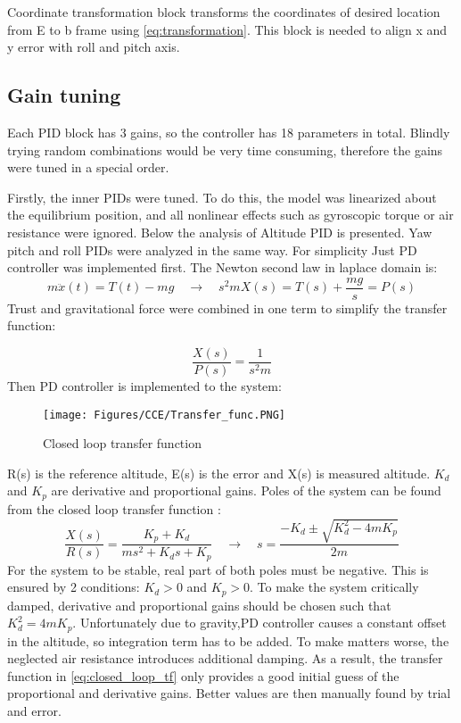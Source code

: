 Coordinate transformation block transforms the coordinates of desired location from E to b frame using \autoref{eq:transformation}. This block is needed to align x and y error with roll and pitch axis. 


\subsection{Gain tuning} \label{subsec:gain_tuning}
Each PID block has 3 gains, so the controller has 18 parameters in total. Blindly trying random combinations would be very time consuming, therefore the gains were tuned in a special order. 

Firstly, the inner PIDs were tuned. To do this, the model was linearized about the equilibrium position, and all nonlinear effects such as gyroscopic torque or air resistance were ignored. Below the analysis of Altitude PID is presented. Yaw pitch and roll PIDs were analyzed in the same way.
For simplicity Just PD controller was implemented first. The Newton second law in laplace domain is:
\begin{equation}
    m \ddot{x}(t) = T(t) - mg \quad \rightarrow \quad
    s^2 m X(s) = T(s) + \frac{mg}{s} = P(s)
\end{equation}
Trust and gravitational force were combined in one term to simplify the transfer function:

\begin{equation}
    \frac{X(s)}{P(s)} = \frac{1}{s^2m}
\end{equation}
Then PD controller is implemented to the system: 

\begin{figure}[H]
    \centering
    \texttt{[image: Figures/CCE/Transfer\_func.PNG]}
    \caption{Closed loop transfer function}
    \label{fig:controler}
\end{figure}

R(s) is the reference altitude, E(s) is the error and X(s) is measured altitude. $K_d$ and $K_p$ are derivative and proportional gains. Poles of the system can be found from the closed loop transfer function : 
\begin{equation}
\label{eq:closed_loop_tf}
    \frac{X(s)}{R(s)} = \frac{K_p+K_d}{m s^2 + K_d s + K_p} \quad \rightarrow \quad 
    s = \frac{-K_d \pm \sqrt{K_d^2 - 4mK_p}}{2m}
\end{equation}
For the system to be stable, real part of both poles must be negative. This is ensured by 2 conditions: $K_d >0$ and $K_p>0$. 
To make the system critically damped, derivative and proportional gains should be chosen such that $K_d^2 = 4mK_p$. Unfortunately due to gravity,PD controller causes a constant offset in the altitude, so integration term has to be added. To make matters worse, the neglected air resistance introduces additional damping. As a result, the transfer function in \autoref{eq:closed_loop_tf} only provides a good initial guess of the proportional and derivative gains. Better values are then manually found by trial and error.

